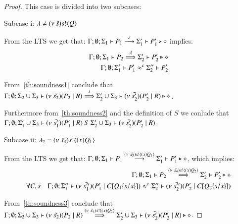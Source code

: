 \begin{proof}


	This case is divided into two subcases:

	\noi Subcase i: $\lambda \not= (\nu\ \tilde{s}) s ! \langle Q \rangle$

	From the LTS we get that:
	$\Gamma; \emptyset; \Sigma_1 \vdash P_1 \stackrel{\lambda}{\longrightarrow} \Sigma_1' \vdash P_1' \triangleright \diamond$
	implies:
	\begin{eqnarray}
		\Gamma; \emptyset; \Sigma_1 \vdash P_2 \stackrel{\lambda}{\Longrightarrow} \Sigma_2' \vdash P_2' \triangleright \diamond \label{th:soundness1}\\
		\Gamma; \emptyset; \Sigma_1' \vdash P_1' \approx^{c} \Sigma_2'' \vdash P_2' \label{th:soundness2}
	\end{eqnarray}

	From~\ref{th:soundness1} conclude that 
	$\Gamma;\emptyset; \Sigma_2 \cup \Sigma_3 \vdash (\nu\ \tilde{s_2})(P_2 \;|\; R) \stackrel{\lambda}{\Longrightarrow} \Sigma_2' \cup \Sigma_3 \vdash (\nu\ \tilde{s_2'})(P_2' \;|\; R) \triangleright \diamond$.

	Furthermore from~\ref{th:soundness2} and the definition of $S$ we conlude that
	$\Gamma; \emptyset; \Sigma_1' \cup \Sigma_3 \vdash (\nu\ \tilde{s_1'})(P_1' \;|\; R)\ S\ \Sigma_2' \cup \Sigma_3 \vdash (\nu\ \tilde{s_2'})(P_2' \;|\; R)$.

	\noi Subcase ii: $\lambda_2 = (\nu\ \tilde{s_3}) s ! \langle (x)Q_1 \rangle$

	From the LTS we get that:
	$\Gamma; \emptyset; \Sigma_1 \vdash P_1 \stackrel{(\nu\ \tilde{s_3}) s ! \langle (x)Q_1 \rangle}{\longrightarrow} \Sigma_1' \vdash P_1' \triangleright \diamond$,
	which implies:
	\begin{eqnarray}
		&& \Gamma; \emptyset; \Sigma_1 \vdash P_2 \stackrel{(\nu\ \tilde{s_4}) s ! \langle (x)Q_2 \rangle}{\Longrightarrow} \Sigma_2' \vdash P_2' \triangleright \diamond \label{th:soundness3}\\
		\forall C, s &&
		\Gamma; \emptyset; \Sigma_1'' \vdash (\nu\ \tilde{s_1''})(P_1' \;|\; C[Q_1 \{s/x \}]) \approx^{c} \Sigma_2'' \vdash (\nu\ \tilde{s_2''})(P_2' \;|\; C[Q_2\{s/x \}]) \label{th:soundness4}
	\end{eqnarray}

	From~\ref{th:soundness3} conclude that 
	$\Gamma;\emptyset; \Sigma_2 \cup \Sigma_3 \vdash (\nu\ \tilde{s_2})(P_2 \;|\; R) \stackrel{(\nu\ \tilde{s_4}) s ! \langle (x)Q_2 \rangle}{\Longrightarrow} \Sigma_2' \cup \Sigma_3 \vdash (\nu\ \tilde{s_2'})(P_2' \;|\; R) \triangleright \diamond$.


\end{proof}
